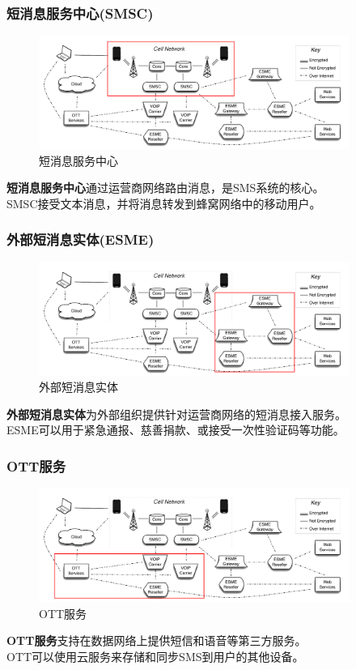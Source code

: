 \documentclass[10pt,aspectratio=43,mathserif]{beamer}
\begin{document}
		\begin{frame}
		  \frametitle{\textbf{短消息服务中心(SMSC)}}
            \begin{figure}[!t]
            \centering
            \includegraphics[width=4in]{figures/figure1.png}
            \caption{短消息服务中心}
            \label{figure1_SMSC}
            \end{figure}
            \textbf{短消息服务中心}通过运营商网络路由消息，是SMS系统的核心。\\
            SMSC接受文本消息，并将消息转发到蜂窝网络中的移动用户。
		\end{frame}

		\begin{frame}
		  \frametitle{\textbf{外部短消息实体(ESME)}}
            \begin{figure}[!t]
            \centering
            \includegraphics[width=4in]{figures/figure2.png}
            \caption{外部短消息实体}
            \label{figure2_ESME}
            \end{figure}
            \textbf{外部短消息实体}为外部组织提供针对运营商网络的短消息接入服务。\\
            ESME可以用于紧急通报、慈善捐款、或接受一次性验证码等功能。
		\end{frame}

        \begin{frame}
		  \frametitle{\textbf{OTT服务}}
			\begin{figure}[!t]
            \centering
            \includegraphics[width=4in]{figures/figure3.png}
            \caption{OTT服务}
            \label{figure3_OTT}
            \end{figure}
            \textbf{OTT服务}支持在数据网络上提供短信和语音等第三方服务。\\
            OTT可以使用云服务来存储和同步SMS到用户的其他设备。
		\end{frame}
\end{document}
